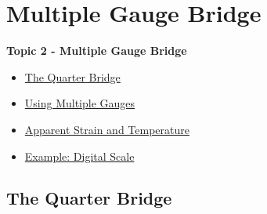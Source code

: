 \documentclass[fleqn]{beamer} %
\newcommand{\sectionIItitle}{Multiple Gauge Bridge}
\newcommand{\sectionIIsubsectionItitle}{The Quarter Bridge}
\newcommand{\sectionIIsubsectionIItitle}{Using Multiple Gauges}
\newcommand{\sectionIIsubsectionIIItitle}{Apparent Strain and Temperature}
\newcommand{\sectionIIsubsectionIVtitle}{Example: Digital Scale}
\begin{document}
	
	\section{\sectionIItitle}\label{sectionII}

		\begin{frame}
			\large \textbf{Topic 2 - \sectionIItitle} \vspace{3mm}\\

			\begin{itemize}
				\item \hyperlink{sectionIIsubsectionI}{\sectionIIsubsectionItitle} \vspc %
				\item \hyperlink{sectionIIsubsectionII}{\sectionIIsubsectionIItitle} \vspc %
				\item \hyperlink{sectionIIsubsectionIII}{\sectionIIsubsectionIIItitle} \vspc %
				\item \hyperlink{sectionIIsubsectionIV}{\sectionIIsubsectionIVtitle} \vspc %
			\end{itemize}

		\end{frame}

		\subsection{\sectionIIsubsectionItitle}\label{sectionIIsubsectionI}
\end{document}

